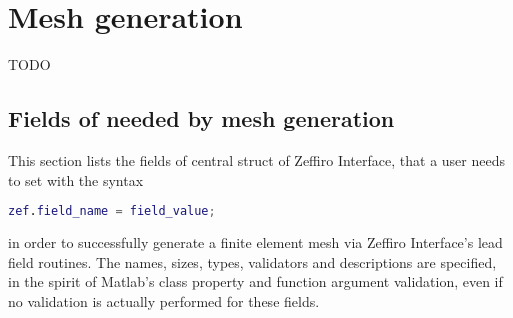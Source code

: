 \section{Mesh generation}\label{sec:mesh-generation}

TODO


\subsection{Fields of  needed by mesh generation}%
\label{ssec:meshing-fields}

This section lists the fields of central struct  of Zeffiro
Interface, that a user needs to set with the syntax
\begin{lstlisting}[style=unnumberedlines, language=Matlab]
zef.field_name = field_value;
\end{lstlisting}
in order to successfully generate a finite element mesh via Zeffiro
Interface's lead field routines. The names, sizes, types, validators and
descriptions are specified, in the spirit of Matlab's class property and
function argument validation, even if no validation is actually performed for
these fields.





